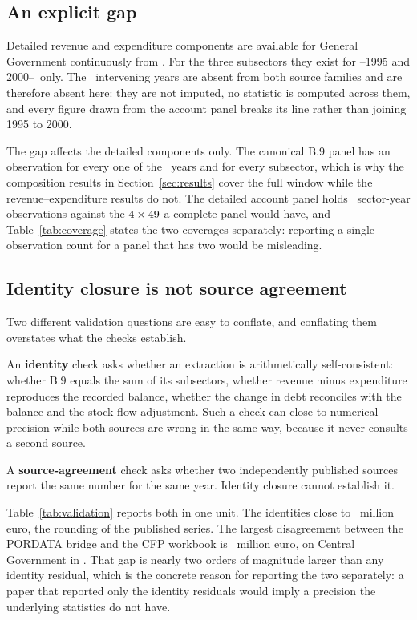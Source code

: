 \subsection{An explicit gap}

Detailed revenue and expenditure components are available for General Government
continuously from \PanelStart. For the three subsectors they exist for
\PanelStart--1995 and 2000--\PanelEnd\ only. The \GapYears\ intervening years are
absent from both source families and are therefore absent here: they are not
imputed, no statistic is computed across them, and every figure drawn from the
account panel breaks its line rather than joining 1995 to 2000.

The gap affects the detailed components only. The canonical B.9 panel has an
observation for every one of the \PanelYears\ years and for every subsector, which
is why the composition results in Section~\ref{sec:results} cover the full window
while the revenue--expenditure results do not. The detailed account panel holds
\AccountObservations\ sector-year observations against the
$4 \times 49$ a complete panel would have, and
Table~\ref{tab:coverage} states the two coverages separately: reporting a single
observation count for a panel that has two would be misleading.



\subsection{Identity closure is not source agreement}

Two different validation questions are easy to conflate, and conflating them
overstates what the checks establish.

An \textbf{identity} check asks whether an extraction is arithmetically
self-consistent: whether B.9 equals the sum of its subsectors, whether revenue
minus expenditure reproduces the recorded balance, whether the change in debt
reconciles with the balance and the stock-flow adjustment. Such a check can close
to numerical precision while both sources are wrong in the same way, because it
never consults a second source.

A \textbf{source-agreement} check asks whether two independently published sources
report the same number for the same year. Identity closure cannot establish it.

Table~\ref{tab:validation} reports both in one unit. The identities close to
\MaxClosureResidual\ million euro, the rounding of the published series. The largest
disagreement between the PORDATA bridge and the CFP workbook is
\MaxSourceDisagreement\ million euro, on Central Government in
\SourceDisagreementWhere. That gap is nearly two orders of magnitude larger than any
identity residual, which is the concrete reason for reporting the two separately:
a paper that reported only the identity residuals would imply a precision the
underlying statistics do not have.


